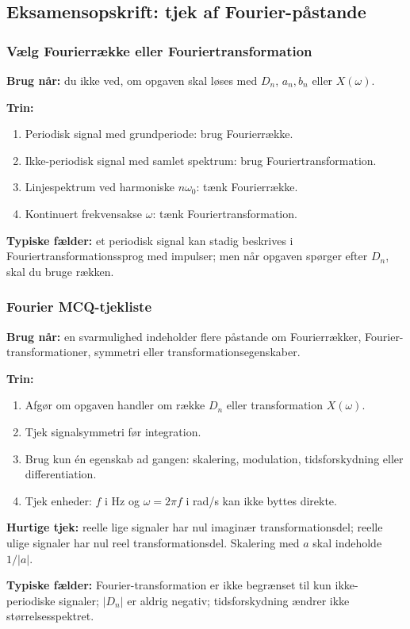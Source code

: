 \subsection{Eksamensopskrift: tjek af Fourier-påstande}

\subsubsection{Vælg Fourierrække eller Fouriertransformation}
\textbf{Brug når:} du ikke ved, om opgaven skal løses med \(D_n\), \(a_n,b_n\) eller \(X(\omega)\).

\textbf{Trin:}
\begin{enumerate}
    \item Periodisk signal med grundperiode: brug Fourierrække.
    \item Ikke-periodisk signal med samlet spektrum: brug Fouriertransformation.
    \item Linjespektrum ved harmoniske \(n\omega_0\): tænk Fourierrække.
    \item Kontinuert frekvensakse \(\omega\): tænk Fouriertransformation.
\end{enumerate}

\textbf{Typiske fælder:} et periodisk signal kan stadig beskrives i Fouriertransformationssprog med impulser; men når opgaven spørger efter \(D_n\), skal du bruge rækken.

\subsubsection{Fourier MCQ-tjekliste}
\textbf{Brug når:} en svarmulighed indeholder flere påstande om Fourierrækker, Fourier-transformationer, symmetri eller transformationsegenskaber.

\textbf{Trin:}
\begin{enumerate}
    \item Afgør om opgaven handler om række \(D_n\) eller transformation \(X(\omega)\).
    \item Tjek signalsymmetri før integration.
    \item Brug kun én egenskab ad gangen: skalering, modulation, tidsforskydning eller differentiation.
    \item Tjek enheder: \(f\) i Hz og \(\omega=2\pi f\) i rad/s kan ikke byttes direkte.
\end{enumerate}

\textbf{Hurtige tjek:} reelle lige signaler har nul imaginær transformationsdel; reelle ulige signaler har nul reel transformationsdel. Skalering med \(a\) skal indeholde \(1/|a|\).

\textbf{Typiske fælder:} Fourier-transformation er ikke begrænset til kun ikke-periodiske signaler; \(|D_n|\) er aldrig negativ; tidsforskydning ændrer ikke størrelsesspektret.
